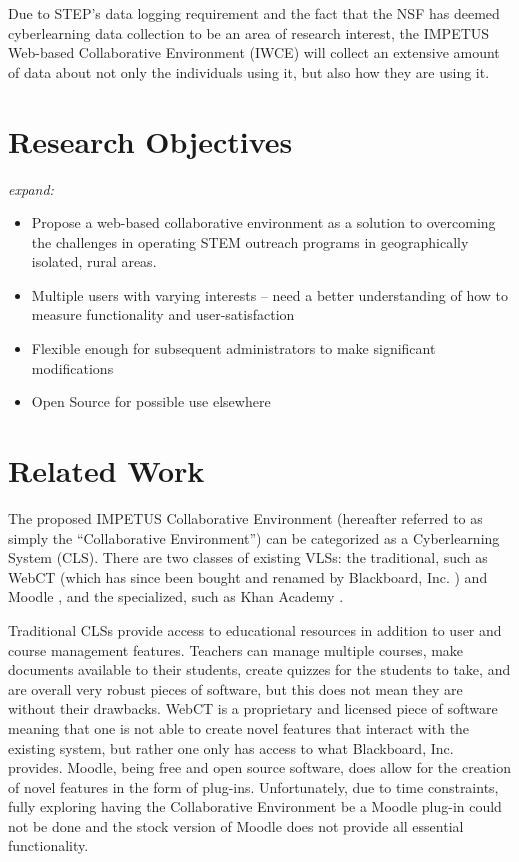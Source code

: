 Due to STEP's data logging requirement and the fact that the NSF has deemed cyberlearning data collection to be an area of research interest, the IMPETUS Web-based Collaborative Environment (IWCE) will collect an extensive amount of data about not only the individuals using it, but also how they are using it.

\section{Research Objectives}
\label{sec:objectives}

\textit{expand:}
\begin{itemize}
	\item Propose a web-based collaborative environment as a solution to overcoming the challenges in operating STEM outreach programs in geographically isolated, rural areas. 
	\item Multiple users with varying interests -- need a better understanding of how to measure functionality and user-satisfaction
	\item Flexible enough for subsequent administrators to make significant modifications
	\item Open Source for possible use elsewhere
\end{itemize}

\section{Related Work}
\label{sec:related-work}

The proposed IMPETUS Collaborative Environment (hereafter referred to as simply the ``Collaborative Environment'') can be categorized as a Cyberlearning System (CLS). There are two classes of existing VLSs: the traditional, such as WebCT \cite{webct} (which has since been bought and renamed by Blackboard, Inc. \cite{blackboard-dot-com}) and Moodle \cite{moodle-dot-net}, and the specialized, such as Khan Academy \cite{khanacademy-dot-org}. 

Traditional CLSs provide access to educational resources in addition to user and course management features. Teachers can manage multiple courses, make documents available to their students, create quizzes for the students to take, and are overall very robust pieces of software, but this does not mean they are without their drawbacks. WebCT is a proprietary and licensed piece of software meaning that one is not able to create novel features that interact with the existing system, but rather one only has access to what Blackboard, Inc. provides. Moodle, being free and open source software, does allow for the creation of novel features in the form of plug-ins. Unfortunately, due to time constraints, fully exploring having the Collaborative Environment be a Moodle plug-in could not be done and the stock version of Moodle does not provide all essential functionality.

